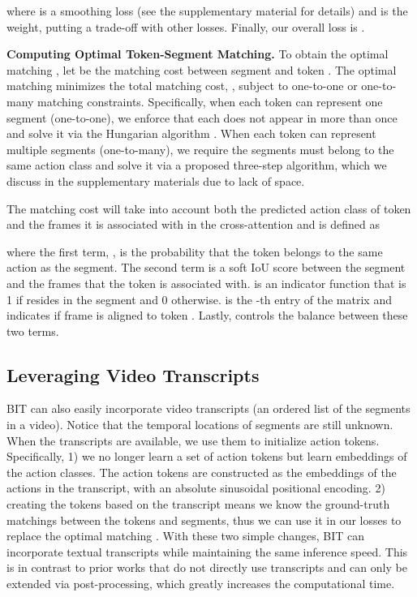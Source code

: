\documentclass[10pt,twocolumn,letterpaper]{article}
\newcommand{\headline}[1]{\noindent \textbf{#1}}
\newcommand{\0}{\boldsymbol{0}}
\begin{document}
where  is a smoothing loss \cite{Farha:CVPR19} (see the supplementary material for details) and  is the weight, putting a trade-off with other losses.
Finally, our overall loss is . 

\headline{Computing Optimal Token-Segment Matching.} To obtain the optimal matching , let  be the matching cost between segment  and token . The optimal matching minimizes the total matching cost, , subject to one-to-one or one-to-many matching constraints. 
Specifically, when each token can represent one segment (one-to-one), we enforce that each  does not appear in  more than once and solve it via the Hungarian algorithm \cite{Kuhn:Hungarian}. When each token can represent multiple segments (one-to-many), we require the segments must belong to the same action class and solve it via a proposed three-step algorithm, which we discuss in the supplementary materials due to lack of space. 

The matching cost  will take into account both the predicted action class of token  and the frames it is associated with in the cross-attention and is defined as

where the first term, , is the probability that the token belongs to the same action as the segment. 
The second term is a soft IoU score between the segment  and the frames that the token is associated with.
 is an indicator function that is 1 if  resides in the segment and 0 otherwise. 
 is the -th entry of the matrix and indicates if frame  is aligned to token . 
Lastly,  controls the balance between these two terms.


 \subsection{Leveraging Video Transcripts}
\label{sec:action-seg-w-transcript}
BIT can also easily incorporate video transcripts (an ordered list of the segments in a video). Notice that the temporal locations of segments are still unknown. 
When the transcripts are available, we use them to initialize action tokens. 
Specifically, 1) we no longer learn a set of action tokens but learn embeddings of the action classes. The action tokens are constructed as the embeddings of the actions in the transcript, with an absolute sinusoidal positional encoding.  
2) creating the tokens based on the transcript means we know the ground-truth matchings between the tokens and segments, 
thus we can use it in our losses to replace the optimal matching . 
With these two simple changes, BIT can incorporate textual transcripts while maintaining the same inference speed. This is in contrast to prior works \cite{Farha:CVPR19,Li:TPAMI20,Yi:BMVC21,Dipika:Arxiv21,Ahn:ICCV21} that do not directly use transcripts and can only be extended via post-processing, which greatly increases the computational time.
\end{document}
